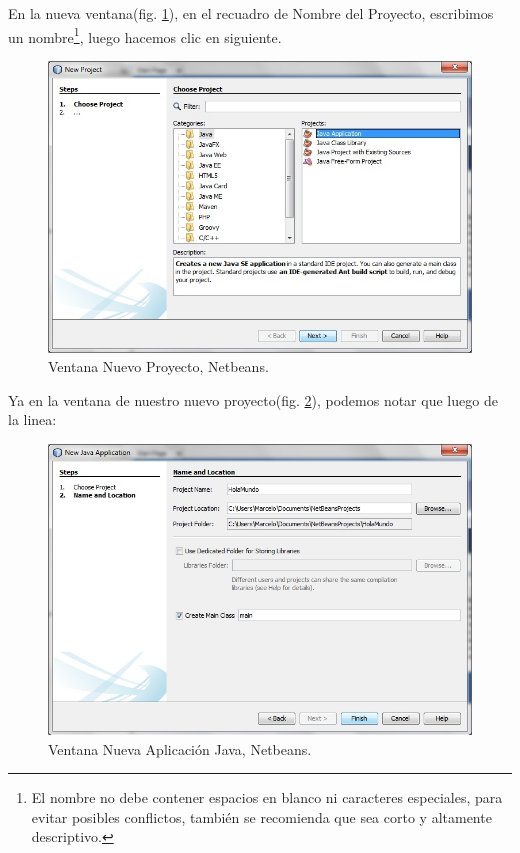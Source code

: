 \documentclass[12pt]{book} %
\begin{document}
En la nueva ventana(fig. \ref{hw02}), en el recuadro de Nombre del Proyecto, escribimos un nombre\footnote{El nombre no debe contener espacios en blanco ni caracteres especiales, para evitar posibles conflictos, también se recomienda que sea corto y altamente descriptivo.}, luego hacemos clic en siguiente.

	\begin{figure}[h]
		\centering
			\includegraphics[width=12cm]{Hola_mundo_002.jpg}
			\caption{Ventana Nuevo Proyecto, Netbeans.}
			\label{hw02}
	\end{figure}

Ya en la ventana de nuestro nuevo proyecto(fig. \ref{hw03}), podemos notar que luego de la linea:

	\begin{figure}[h]
		\centering
			\includegraphics[width=12cm]{Hola_mundo_003.jpg}
			\caption{Ventana Nueva Aplicación Java, Netbeans.}
			\label{hw03}
	\end{figure}
\end{document}
